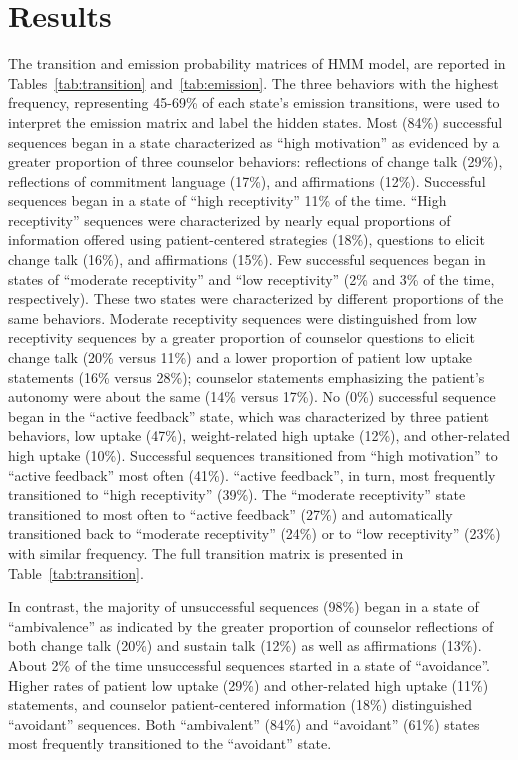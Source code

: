\section{Results}
\label{sec:results}
The transition and emission probability matrices of HMM model, are reported in Tables~\ref{tab:transition} and~\ref{tab:emission}. The three behaviors with the highest frequency, representing 45-69\% of each state’s emission transitions, were used to interpret the emission matrix and label the hidden states. Most (84\%) successful sequences began in a state characterized as “high motivation” as evidenced by a greater proportion of three counselor behaviors: reflections of change talk (29\%), reflections of commitment language (17\%), and affirmations (12\%). Successful sequences began in a state of “high receptivity” 11\% of the time. “High receptivity” sequences were characterized by nearly equal proportions of information offered using patient-centered strategies (18\%), questions to elicit change talk (16\%), and affirmations (15\%). Few successful sequences began in states of “moderate receptivity” and “low receptivity” (2\% and 3\% of the time, respectively). These two states were characterized by different proportions of the same behaviors. Moderate receptivity sequences were distinguished from low receptivity sequences by a greater proportion of counselor questions to elicit change talk (20\% versus 11\%) and a lower proportion of patient low uptake statements (16\% versus 28\%); counselor statements emphasizing the patient’s autonomy were about the same (14\% versus 17\%). No (0\%) successful sequence began in the “active feedback” state, which was characterized by three patient behaviors, low uptake (47\%), weight-related high uptake (12\%), and other-related high uptake (10\%). Successful sequences transitioned from “high motivation” to “active feedback” most often (41\%). “active feedback”, in turn, most frequently transitioned to “high receptivity” (39\%). The “moderate receptivity” state transitioned to most often to “active feedback” (27\%) and automatically transitioned back to “moderate receptivity” (24\%) or to “low receptivity” (23\%) with similar frequency. The full transition matrix is presented in Table~\ref{tab:transition}.

In contrast, the majority of unsuccessful sequences (98\%) began in a state of “ambivalence” as indicated by the greater proportion of counselor reflections of both change talk (20\%) and sustain talk (12\%) as well as affirmations (13\%). About 2\% of the time unsuccessful sequences started in a state of “avoidance”. Higher rates of patient low uptake (29\%) and other-related high uptake (11\%) statements, and counselor patient-centered information (18\%) distinguished “avoidant” sequences. Both “ambivalent” (84\%) and “avoidant” (61\%) states most frequently transitioned to the “avoidant” state.


